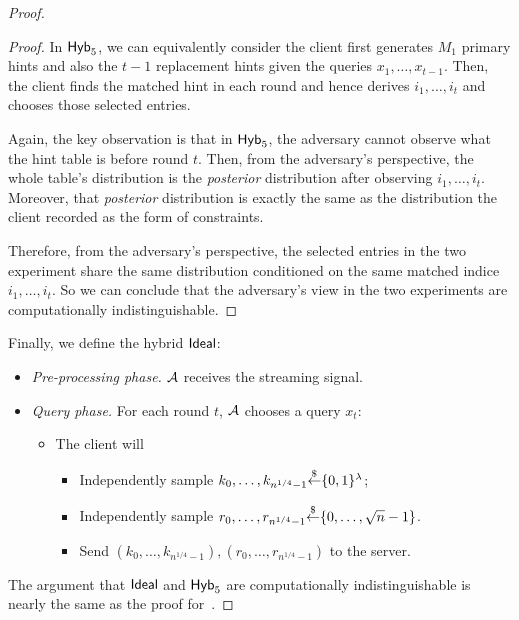 \begin{proof}
\begin{proof}
        In ${\sf Hyb}_5$, we can equivalently consider the client first generates $M_1$ primary hints and also the $t-1$ replacement hints given the queries $x_1,\dots,x_{t-1}$. 
        Then, the client finds the matched hint in each round and hence derives $i_1,\dots,i_t$ and chooses those selected entries.
        
        Again, the key observation is that in ${\sf Hyb}_5$, the adversary cannot observe what the hint table is before round $t$. 
        Then, from the adversary's perspective, the whole table's distribution is the \textit{posterior} distribution after observing $i_1,\dots,i_{t}$. 
        Moreover, that \textit{posterior} distribution is exactly the same as the distribution the client recorded as the form of constraints.
        
        Therefore, from the adversary's perspective, the selected entries in the two experiment share the same distribution conditioned on the same matched indice $i_1,\dots,i_t$.
        So we can conclude that the adversary's view in the two experiments are computationally indistinguishable. 
    \end{proof}
    
    
    Finally, we define the hybrid ${\sf Ideal}$:
    
        \begin{itemize}
        \item \textit{Pre-processing phase.} $\mathcal{A}$ receives the streaming signal. 
        \item \textit{Query phase.} For each round $t$, $\mathcal{A}$ chooses a query $x_t$:
        \begin{itemize}
            \item The client will
            \begin{itemize}
                \item Independently sample $k_0,\dots,k_{n^{1/4}-1}{\overset{\$}{\leftarrow}}\{0,1\}^\lambda$;
                \item Independently sample $r_0,\dots,r_{n^{1/4}-1}{\overset{\$}{\leftarrow}}\{0,\dots,\sqrt{n}-1\}$.
                \item Send $(k_0,\dots,k_{n^{1/4}-1}),
                (r_0,\dots,r_{n^{1/4}-1})$ to the server.
            \end{itemize}
        \end{itemize}
    \end{itemize}
        
    The argument that ${\sf Ideal}$ and ${\sf Hyb}_5$ are computationally indistinguishable is nearly the same as the proof for~.
\end{proof}


